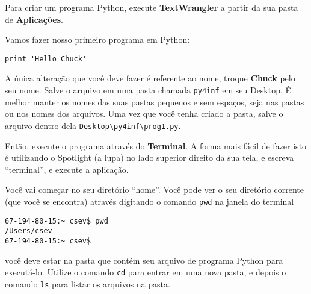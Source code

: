 Para criar um programa Python, execute {\bf TextWrangler} a partir da sua 
pasta de {\bf Aplicações}.


Vamos fazer nosso primeiro programa em Python:

\beforeverb
\begin{verbatim}
print 'Hello Chuck'
\end{verbatim}
\afterverb
%
%
A única alteração que você deve fazer é referente ao nome, troque {\bf Chuck} 
pelo seu nome. Salve o arquivo em uma pasta chamada {\tt py4inf} em seu 
Desktop. É melhor manter os nomes das suas pastas pequenos e sem espaços, 
seja nas pastas ou nos nomes dos arquivos. Uma vez que você tenha criado a 
pasta, salve o arquivo dentro dela {\tt Desktop{\textbackslash}py4inf{\textbackslash}prog1.py}.


Então, execute o programa através do {\bf Terminal}. A forma mais fácil de 
fazer isto é utilizando o Spotlight (a lupa) no lado superior direito da sua 
tela, e escreva ``terminal'', e execute a aplicação.


Você vai começar no seu diretório ``home''. Você pode ver o seu diretório 
corrente (que você se encontra) através digitando o comando {\tt pwd} na 
janela do terminal

\beforeverb
\begin{verbatim}
67-194-80-15:~ csev$ pwd
/Users/csev
67-194-80-15:~ csev$ 
\end{verbatim}
\afterverb
%
%
você deve estar na pasta que contém seu arquivo de programa Python para 
executá-lo. Utilize o comando {\tt cd} para entrar em uma nova pasta, e 
depois o comando {\tt ls} para listar os arquivos na pasta.

